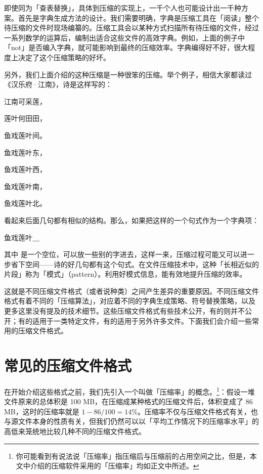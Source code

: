 即使同为「查表替换」，具体到压缩的实现上，一千个人也可能设计出一千种方案。首先是字典生成方法的设计。我们需要明确，字典是压缩工具在「阅读」整个待压缩的文件时现场编纂的。压缩工具会以某种方式扫描所有待压缩的文件，经过一系列数学的运算后，编制出适合这些文件的高效字典。例如，上面的例子中「not」是否编入字典，就可能影响到最终的压缩效率。字典编得好不好，很大程度上决定了这个压缩策略的好坏。

另外，我们上面介绍的这种压缩是一种很笨的压缩。举个例子，相信大家都读过《汉乐府·江南》，诗是这样写的：

\begin{quoting}
  江南可采莲，\par
  莲叶何田田，\par
  鱼戏莲叶间。\par
  鱼戏莲叶东，\par
  鱼戏莲叶西，\par
  鱼戏莲叶南，\par
  鱼戏莲叶北。
\end{quoting}

看起来后面几句都有相似的结构。那么，如果把这样的一个句式作为一个字典项：

\begin{MissingVerbatim}
  鱼戏莲叶＿
\end{MissingVerbatim}

其中  是一个空位，可以放一些别的字进去，这样一来，压缩过程可能又可以进一步省下空间——诗的好几句都有这个句式。在文件压缩技术中，这种「长相近似的片段」称为「模式」（pattern）。利用好模式信息，能有效地提升压缩的效率。

这就是不同压缩文件格式（或者说种类）之间产生差异的重要原因。不同压缩文件格式有着不同的「压缩算法」，对应着不同的字典生成策略、符号替换策略，以及更多这里没有提及的技术细节。这些压缩文件格式有些技术公开，有的则并不公开；有的适用于一类特定文件，有的适用于另外许多文件。下面我们会介绍一些常用的压缩文件格式。

\section{常见的压缩文件格式}

在开始介绍这些格式之前，我们先引入一个叫做「压缩率」的概念。\footnote{你可能看到有说法说「压缩率」指压缩后与压缩前的占用空间之比，但是，本文中介绍的压缩软件采用的「压缩率」均如正文中所述。}：假设一堆文件原来的总体积是 100 MB，在压缩成某种格式的压缩文件后，体积变成了 86 MB，这时的压缩率就是 $1 - 86/100 = 14\%$。压缩率不仅与压缩文件格式有关，也与源文件本身的性质有关，但我们仍然可以以「平均工作情况下的压缩率水平」的高低来笼统地比较几种不同的压缩文件格式。

